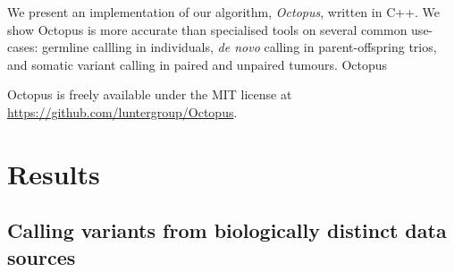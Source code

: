 \documentclass[notitlepage, twocolumn]{article}
\begin{document}
We present an implementation of our algorithm, \emph{Octopus}, written in C++. We show Octopus is more accurate than specialised tools on several common use-cases: germline callling in individuals, \textit{de novo} calling in parent-offspring trios, and somatic variant calling in paired and unpaired tumours. Octopus 

Octopus is freely available under the MIT license at \url{https://github.com/luntergroup/Octopus}.

\section*{Results}

\subsection*{Calling variants from biologically distinct data sources}
\end{document}
